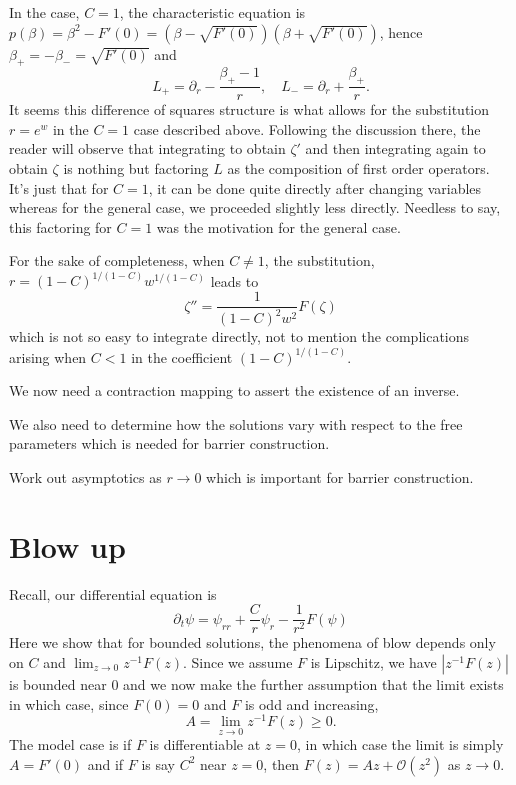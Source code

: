 \documentclass{amsart}
\begin{document}
\begin{rem}
In the case, \(C = 1\), the characteristic equation is \(p(\beta) = \beta^2 - F'(0) = (\beta - \sqrt{F'(0)})(\beta + \sqrt{F'(0)})\), hence \(\beta_+ = -\beta_- = \sqrt{F'(0)}\) and
\[
L_+ = \partial_r - \frac{\beta_+ - 1}{r}, \quad L_- = \partial_r + \frac{\beta_+}{r}.
\]
It seems this difference of squares structure is what allows for the substitution \(r = e^w\) in the \(C=1\) case described above. Following the discussion there, the reader will observe that integrating to obtain \(\zeta'\) and then integrating again to obtain \(\zeta\) is nothing but factoring \(L\) as the composition of first order operators. It's just that for \(C = 1\), it can be done quite directly after changing variables whereas for the general case, we proceeded slightly less directly. Needless to say, this factoring for \(C = 1\) was the motivation for the general case.

For the sake of completeness, when \(C \ne 1\), the substitution, \(r = (1-C)^{1/(1-C)} w^{1/(1-C)}\) leads to
\[
\zeta'' = \frac{1}{(1-C)^2 w^2} F(\zeta)
\]
which is not so easy to integrate directly, not to mention the complications arising when \(C < 1\) in the coefficient \((1 - C)^{1/(1 - C)}\).
\end{rem}

{\color{red} We now need a contraction mapping to assert the existence of an inverse}.

{\color{red}We also need to determine how the solutions vary with respect to the free parameters which is needed for barrier construction}.

{\color{red}Work out asymptotics as \(r\to 0\) which is important for barrier construction}.

\section{Blow up}

Recall, our differential equation is
\[
\partial_t \psi = \psi_{rr} + \frac{C}{r} \psi_r - \frac{1}{r^2} F(\psi)
\]
Here we show that for bounded solutions, the phenomena of blow depends only on \(C\) and \(\lim_{z\to 0} z^{-1} F(z)\). Since we assume \(F\) is Lipschitz, we have \(|z^{-1} F(z)|\) is bounded near \(0\) and we now make the further assumption that the limit exists in which case, since \(F(0) = 0\) and \(F\) is odd and increasing,
\[
A = \lim_{z\to 0} z^{-1} F(z) \geq 0.
\]
The model case is if \(F\) is differentiable at \(z=0\), in which case the limit is simply \(A = F'(0)\) and if \(F\) is say \(C^2\) near \(z=0\), then \(F(z) = Az + \mathcal{O} (z^2)\) as \(z \to 0\).
\end{document}
